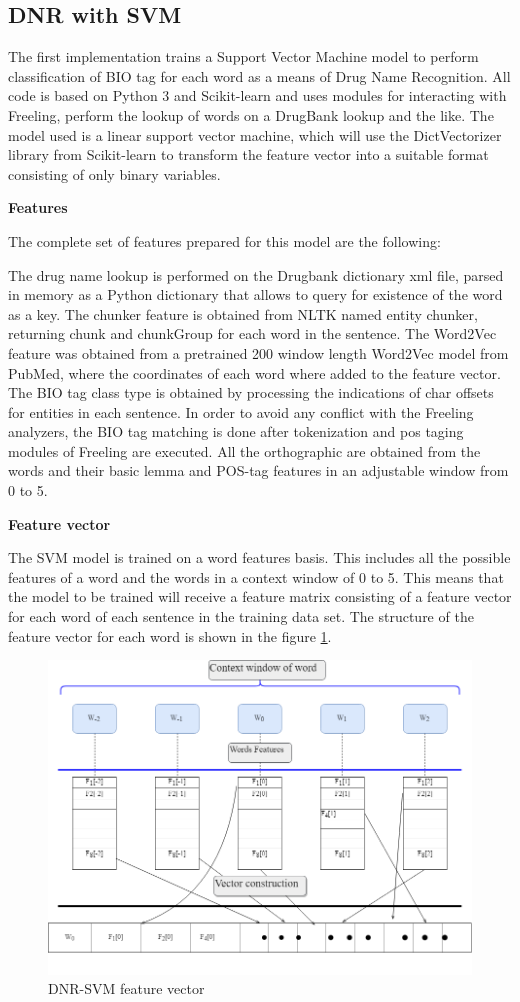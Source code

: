 \subsection{DNR with SVM}

The first implementation trains a Support Vector Machine model to perform classification of BIO tag for each word as a means of Drug Name Recognition. All code is based on Python 3 and Scikit-learn and uses modules for interacting with Freeling, perform the lookup of words on a DrugBank lookup and the like. The model used is a linear support vector machine, which will use the DictVectorizer library from Scikit-learn to transform the feature vector into a suitable format consisting of only binary variables. 

\textbf{Features}

The complete set of features prepared for this model are the following:

The drug name lookup is performed on the Drugbank dictionary xml file, parsed in memory as a Python dictionary that allows to query for existence of the word as a key. The chunker feature is obtained from NLTK named entity chunker, returning chunk and chunkGroup for each word in the sentence. 
The Word2Vec feature was obtained from a pretrained 200 window length Word2Vec model from PubMed, where the coordinates of each word where added to the feature vector.
The BIO tag class type is obtained by processing the indications of char offsets for entities in each sentence. In order to avoid any conflict with the Freeling analyzers, the BIO tag matching is done after tokenization and pos taging modules of Freeling are executed. All the orthographic are obtained from the words and their basic lemma and POS-tag features in an adjustable window from 0 to 5. 

\textbf{Feature vector}

The SVM model is trained on a word features basis. This includes all the possible features of a word and the words in a context window of 0 to 5.  This means that the model to be trained will receive a feature matrix consisting of a feature vector for each word of each sentence in the training data set. The structure of the feature vector for each word is shown in the figure \ref{dnrsvm}.

\begin{figure}[H]
\centering
\includegraphics[scale=0.3]{VectorConstruction.png}\caption{DNR-SVM feature vector}\label{dnrsvm}
\end{figure}




